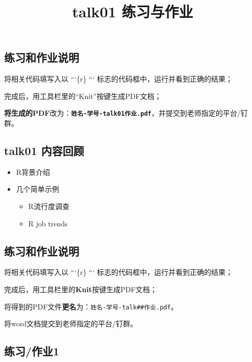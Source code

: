 \documentclass[
]{ctexart}
\title{talk01 练习与作业}
\author{}
\date{\vspace{-2.5em}}
\providecommand{\tightlist}{%
  \setlength{\itemsep}{0pt}\setlength{\parskip}{0pt}}
\begin{document}
\maketitle

{
\setcounter{tocdepth}{2}
\tableofcontents
}
\hypertarget{ux7ec3ux4e60ux548cux4f5cux4e1aux8bf4ux660e}{%
\subsection{练习和作业说明}\label{ux7ec3ux4e60ux548cux4f5cux4e1aux8bf4ux660e}}

将相关代码填写入以 ```\{r\} ``` 标志的代码框中，运行并看到正确的结果；

完成后，用工具栏里的``Knit''按键生成PDF文档；

\textbf{将生成的PDF}改为：\textbf{\texttt{姓名-学号-talk01作业.pdf}}，并提交到老师指定的平台/钉群。

\hypertarget{talk01-ux5185ux5bb9ux56deux987e}{%
\subsection{talk01 内容回顾}\label{talk01-ux5185ux5bb9ux56deux987e}}

\begin{itemize}
\item
  R背景介绍
\item
  几个简单示例

  \begin{itemize}
  \tightlist
  \item
    R流行度调查
  \item
    R job trends
  \end{itemize}
\end{itemize}

\hypertarget{ux7ec3ux4e60ux548cux4f5cux4e1aux8bf4ux660e-1}{%
\subsection{练习和作业说明}\label{ux7ec3ux4e60ux548cux4f5cux4e1aux8bf4ux660e-1}}

将相关代码填写入以 ```\{r\} ``` 标志的代码框中，运行并看到正确的结果；

完成后，用工具栏里的\textbf{Knit}按键生成PDF文档；

将得到的PDF文件\textbf{更名}为：\texttt{姓名-学号-talk\#\#作业.pdf}。

将word文档提交到老师指定的平台/钉群。

\hypertarget{ux7ec3ux4e60ux4f5cux4e1a1}{%
\subsection{练习/作业1}\label{ux7ec3ux4e60ux4f5cux4e1a1}}
\end{document}
